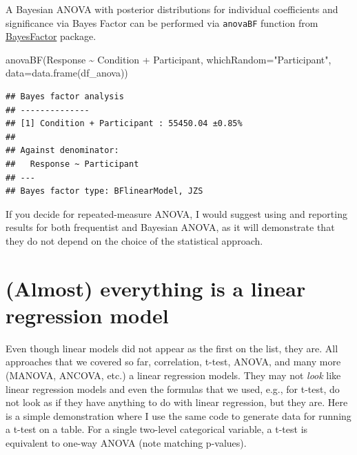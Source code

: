 \documentclass[
]{book}
\newenvironment{Shaded}{\begin{snugshade}}{\end{snugshade}}
\newcommand{\AttributeTok}[1]{\textcolor[rgb]{0.77,0.63,0.00}{#1}}
\newcommand{\FunctionTok}[1]{\textcolor[rgb]{0.00,0.00,0.00}{#1}}
\newcommand{\NormalTok}[1]{#1}
\newcommand{\SpecialCharTok}[1]{\textcolor[rgb]{0.00,0.00,0.00}{#1}}
\newcommand{\StringTok}[1]{\textcolor[rgb]{0.31,0.60,0.02}{#1}}
\begin{document}
A Bayesian ANOVA with posterior distributions for individual coefficients and significance via Bayes Factor can be performed
via \texttt{anovaBF} function from \href{https://richarddmorey.github.io/BayesFactor}{BayesFactor} package.

\begin{Shaded}
\begin{Highlighting}[]
\FunctionTok{anovaBF}\NormalTok{(Response }\SpecialCharTok{\textasciitilde{}}\NormalTok{ Condition }\SpecialCharTok{+}\NormalTok{ Participant, }\AttributeTok{whichRandom=}\StringTok{"Participant"}\NormalTok{, }\AttributeTok{data=}\FunctionTok{data.frame}\NormalTok{(df\_anova))}
\end{Highlighting}
\end{Shaded}

\begin{verbatim}
## Bayes factor analysis
## --------------
## [1] Condition + Participant : 55450.04 ±0.85%
## 
## Against denominator:
##   Response ~ Participant 
## ---
## Bayes factor type: BFlinearModel, JZS
\end{verbatim}

If you decide for repeated-measure ANOVA, I would suggest using and reporting results for both frequentist and Bayesian ANOVA, as it will demonstrate that they do not depend on the choice of the statistical approach.

\hypertarget{almost-everything-is-a-linear-regression-model}{%
\section{(Almost) everything is a linear regression model}\label{almost-everything-is-a-linear-regression-model}}

Even though linear models did not appear as the first on the list, they are. All approaches that we covered so far, correlation, t-test, ANOVA, and many more (MANOVA, ANCOVA, etc.) a linear regression models. They may not \emph{look} like linear regression models and even the formulas that we used, e.g., for t-test, do not look as if they have anything to do with linear regression, but they are. Here is a simple demonstration where I use the same code to generate data for running a t-test on a table. For a single two-level categorical variable, a t-test is equivalent to one-way ANOVA (note matching p-values).
\end{document}
